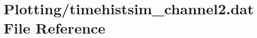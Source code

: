 \hypertarget{Plotting_2timehistsim__channel2_8dat}{}\section{Plotting/timehistsim\+\_\+channel2.dat File Reference}
\label{Plotting_2timehistsim__channel2_8dat}
